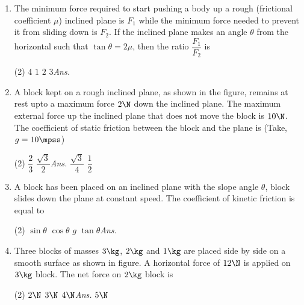 \documentclass{article}
\newcommand{\ans}{\textcolor{red!95}{\textit{\quad Ans.}}}
\begin{document}
\begin{enumerate}
\item The minimum force required to start pushing a body up a rough (frictional coefficient $\mu$) inclined plane is $F_1$ while the minimum force needed to prevent it from sliding down is $F_2$. If the inclined plane makes an angle $\theta$ from the horizontal such
that $\tan\theta = 2\mu$, then the ratio $\dfrac{F_1}{F_2}$ is
\begin{tasks}(2)
	\task $4$
	\task $1$
	\task $2$
	\task $3$\ans
\end{tasks}

\item A block kept on a rough inclined plane, as shown in the figure, remains at rest upto a maximum force $2 \N$ down the inclined plane. The maximum external force up the inclined plane that does not move the block is $10 \N$. The coefficient of static friction between the block and the plane is (Take, $g = 10 \mpss$)
\begin{center}
\end{center}
\begin{tasks}(2)
	\task $\dfrac{2}{3}$
	\task $\dfrac{\sqrt{3}}{2}$\ans
	\task $\dfrac{\sqrt{3}}{4}$
	\task $\dfrac{1}{2}$
\end{tasks}


\item A block has been placed on an inclined plane with the slope angle $\theta$, block slides down the plane at constant speed. The coefficient of kinetic friction is equal to
\begin{tasks}(2)
	\task $\sin\theta$
	\task $\cos\theta$
	\task $g$
	\task $\tan\theta$\ans
\end{tasks}

\item Three blocks of masses $3 \kg$, $2 \kg$ and $1 \kg$ are placed side by side on a smooth surface as shown in figure. A horizontal force of $12 \N$ is applied on $3 \kg$ block. The net force on $2 \kg$ block is
\begin{center}
\end{center} 
\begin{tasks}(2)
	\task $2\N$
	\task $3\N$
	\task $4\N$\ans
	\task $5\N$
\end{tasks}


\end{enumerate}
\end{document}
